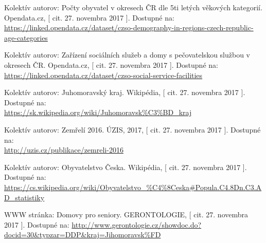 \documentclass[a4paper, 11pt]{article}
\begin{document}
    \renewcommand\refname{Odkazy}
    \begin{thebibliography}{9}
     Kolektív autorov: Počty obyvatel v okresech ČR dle 5ti letých věkových kategorií. Opendata.cz, [ cit. 27. novembra 2017 ]. Dostupné na: \\\url{https://linked.opendata.cz/dataset/czso-demography-in-regions-czech-republic-age-categories}
    
     Kolektív autorov: Zařízení sociálních služeb a domy s pečovatelskou službou v okresech ČR. Opendata.cz, [ cit. 27. novembra 2017 ]. Dostupné na: \\\url{https://linked.opendata.cz/dataset/czso-social-service-facilities}
    
     Kolektív autorov: Juhomoravský kraj. Wikipédia, [ cit. 27. novembra 2017 ]. Dostupné na: \\\url{https://sk.wikipedia.org/wiki/Juhomoravsk%C3%BD_kraj}
    
     Kolektív autorov: Zemřelí 2016. ÚZIS, 2017, [ cit. 27. novembra 2017 ]. Dostupné na:
    \\\url{http://uzis.cz/publikace/zemreli-2016}
    
     Kolektív autorov: Obyvatelstvo Česka. Wikipédia, [ cit. 27. novembra 2017 ]. Dostupné na:\\\url{https://cs.wikipedia.org/wiki/Obyvatelstvo_%C4%8Ceska#Popula.C4.8Dn.C3.AD_statistiky}
    
     WWW stránka: Domovy pro seniory. GERONTOLOGIE, [ cit. 27. novembra 2017 ]. Dostupné na: 
    \url{http://www.gerontologie.cz/showdoc.do?docid=30&typzar=DDP&kraj=Jihomoravsk%FD}
    
    \end{thebibliography}
    
    
\end{document}
